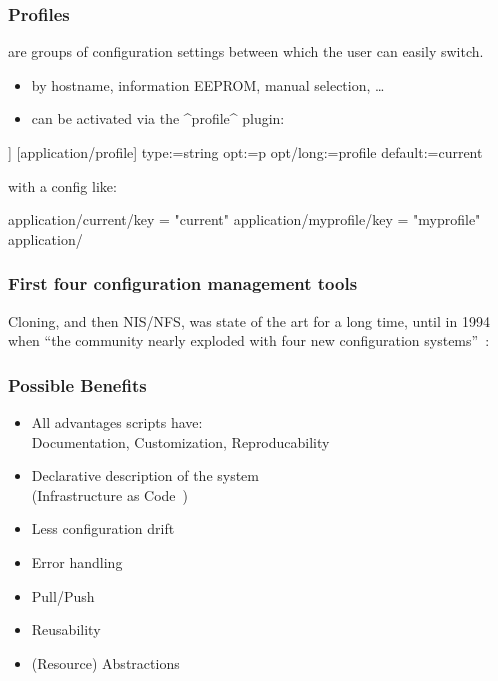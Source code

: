 \begin{frame}[fragile]
	\frametitle{Profiles}

	 are groups of configuration settings between which the user can easily switch.

	\begin{itemize}
	\item by hostname, information EEPROM, manual selection, \dots
	\item can be activated via the ^profile^ plugin:
	\end{itemize}

	\begin{code}[morekeywords={long},gobble=4]]
	[application/profile]
	  type:=string
	  opt:=p
	  opt/long:=profile
	  default:=current
	\end{code}

	with a config like:
	\begin{code}[gobble=4,language=CfgElektra]
	application/current/key = "current"
	application/myprofile/key = "myprofile"
	application/%
	\end{code}
\end{frame}


\begin{frame}
	\frametitle{First four configuration management tools}
	Cloning, and then NIS/NFS, was state of the art for a long time, until in 1994 when \enquote{the community nearly exploded with four new configuration systems}~\cite{evard1997analysis}:

\end{frame}

\begin{frame}
	\frametitle{Possible Benefits}

	\begin{itemize}[<+-| alert@+>]
	\item All advantages scripts have: \\
		Documentation, Customization, Reproducability
	\item Declarative description of the system \\
		(Infrastructure as Code~\cite{waldemar2013testing})
	\item Less configuration drift
	\item Error handling
	\item Pull/Push
	\item Reusability
	\item (Resource) Abstractions
	\end{itemize}
\end{frame}



